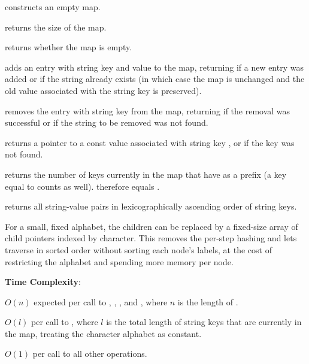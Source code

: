 \begin{compactitem}
  \item {} constructs an empty map.
  \item {} returns the size of the map.
  \item {} returns whether the map is empty.
  \item {} adds an entry with string key  and value  to the map, returning  if a new entry was added or  if the string already exists (in which case the map is unchanged and the old value associated with the string key is preserved).
  \item {} removes the entry with string key  from the map, returning  if the removal was successful or  if the string to be removed was not found.
  \item {} returns a pointer to a const value associated with string key , or  if the key was not found.
  \item {} returns the number of keys currently in the map that have  as a prefix (a key equal to  counts as well).  therefore equals .
  \item {} returns all string-value pairs in lexicographically ascending order of string keys.
\end{compactitem}

For a small, fixed alphabet, the  children can be replaced by a fixed-size array of child pointers indexed by character. This removes the per-step hashing and lets  traverse in sorted order without sorting each node's labels, at the cost of restricting the alphabet and spending more memory per node.

\textbf{Time Complexity}:
\begin{compactitem}
  \item $O(n)$ expected per call to , , , and , where $n$ is the length of .
  \item $O(l)$ per call to , where $l$ is the total length of string keys that are currently in the map, treating the character alphabet as constant.
  \item $O(1)$ per call to all other operations.
\end{compactitem}

